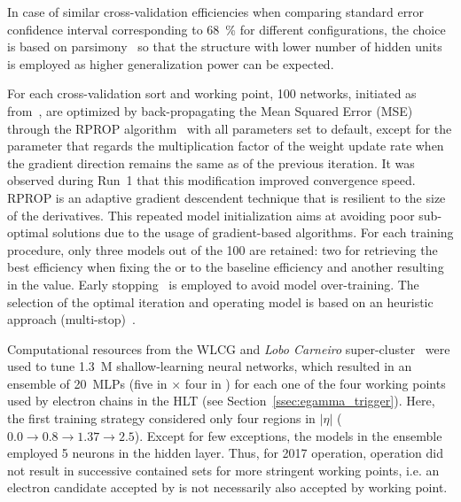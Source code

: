 In case of similar cross-validation efficiencies when comparing standard
error confidence interval corresponding to \SI{68}{\%} for different
configurations, the choice is based on
parsimony~\cite{haykin_2008, medeiros2001statistical} so that the structure with lower number of hidden units
is employed as higher generalization power can be expected. 






For each cross-validation sort and working point, 100 networks, initiated
as from~\cite{initnw}, are optimized by back-propagating the Mean Squared Error (MSE) through the RPROP
algorithm~\cite{rprop} with all parameters set to default,
except for the parameter that regards the multiplication factor of the weight update rate when the gradient direction remains the same as of the previous iteration. It was 
observed during Run~1 that this modification improved convergence speed. RPROP
is an adaptive gradient descendent technique that is resilient to the size of
the derivatives. This repeated model initialization aims at
avoiding poor sub-optimal solutions due to the usage of gradient-based algorithms.
For each training procedure, only three models out of the 100 are retained: two
for retrieving the best efficiency when fixing the \pd{} or \pf{} to the
baseline \fastcalo{} efficiency and another resulting in the \spmax{} value.
Early stopping~\cite{haykin_2008} is employed to avoid model over-training. The
selection of the optimal iteration and operating model is based on an heuristic approach (multi-stop)~\cite{Goodfellow2016}.


Computational resources from the WLCG and \emph{Lobo Carneiro}
super-cluster~\cite{lobo_carneiro} were used to tune 1.3~M shallow-learning
neural networks, which resulted in an ensemble of \SI{20}{MLPs} (five in \et{}
$\times$ four in \abseta{}) for each one of the four working points used by
electron chains in the HLT (see Section~\ref{ssec:egamma_trigger}).
Here, the first training strategy considered only four regions in $|\eta|$ ($0.0\rightarrow 0.8\rightarrow1.37\rightarrow2.5$).
Except for few exceptions, the models in the ensemble employed 5 neurons in the 
hidden layer.  Thus, for 2017 operation, 
\rnn{} operation did not result in
successive contained sets for more stringent working points, i.e. an electron
candidate accepted by \medium{} is not necessarily also accepted by \loose{}
working point. %



